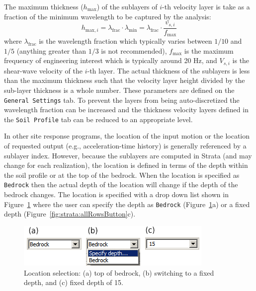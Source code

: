 \documentclass[12pt,oneside]{book}
\begin{document}
The maximum thickness ($h_\text{max}$) of the sublayers of $i$-th velocity layer is take as a
fraction of the minimum wavelength to be captured by the analysis:
\begin{equation}
    h_{\text{max},i} = \lambda_\text{frac} \cdot \lambda_\text{min} = \lambda_\text{frac} \cdot
    \frac{v_{s,i}}{f_\text{max}}
\end{equation}
where $\lambda_{\text{frac}}$ is the wavelength fraction which typically varies between $1/10$ and
$1/5$ (anything greater than $1/3$ is not recommended), $f_{\text{max}}$ is the maximum frequency of
engineering interest which is typically around 20 Hz, and $V_{s,i}$ is the shear-wave velocity of
the $i$-th layer.  The actual thickness of the sublayers is less than the maximum thickness such
that the velocity layer height divided by the sub-layer thickness is a whole number.  These
parameters are defined on the \texttt{General Settings} tab.  To prevent the layers from being
auto-discretized the wavelength fraction can be increased and the thickness velocity layers defined
in the \texttt{Soil Profile} tab can be reduced to an appropriate level.

In other site response programs, the location of the input motion or the location of
requested output (e.g., acceleration-time history) is generally referenced by a sublayer index.
However, because the sublayers are computed in Strata (and may change for
each realization), the location is defined in terms of the depth within the soil profile
or at the top of the bedrock.  When the location is specified as \texttt{Bedrock} then the actual depth
of the location will change if the depth of the bedrock changes.  The location is specified with a
drop down list shown in Figure~\ref{fig:strata:locationSlection} where the user can specify the
depth as \texttt{Bedrock} (Figure~\ref{fig:strata:locationSlection}a) or a fixed depth
(Figure~\ref{fig:strata:allRowsButton}c).

\begin{figure}[htb]
    \begin{center}
        \includegraphics[scale=0.65]{figures/strata/locationSelection.png}
    \end{center}
    \caption[Strata location selection]{Location selection: (a) top of bedrock, (b) switching to a
    fixed depth, and (c) fixed depth of 15.}
    \label{fig:strata:locationSlection}
\end{figure}
\end{document}
